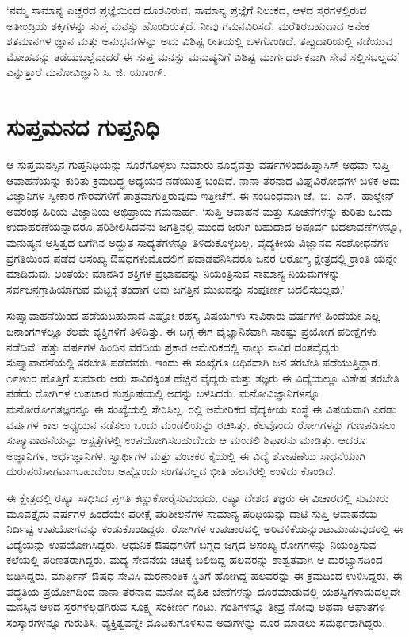 ‘ನಮ್ಮ ಸಾಮಾನ್ಯ ಎಚ್ಚರದ ಪ್ರಜ್ಞೆಯಿಂದ ದೂರವಿರುವ, ಸಾಮಾನ್ಯ ಪ್ರಜ್ಞೆಗೆ ನಿಲುಕದ, ಆಳದ ಸ್ತರಗಳಲ್ಲಿರುವ ಅತೀಂದ್ರಿಯ ಶಕ್ತಿಗಳನ್ನು ಸುಪ್ತ ಮನಸ್ಸು ಹೊಂದಿರುತ್ತದೆ. ನೀವು ಗಮನವಿರಿಸದೆ, ಮರೆತಿರಬಹುದಾದ ಅನೇಕ ಶತಮಾನಗಳ ಜ್ಞಾನ ಮತ್ತು ಅನುಭವಗಳನ್ನು ಅದು ವಿಶಿಷ್ಟ ರೀತಿಯಲ್ಲಿ ಒಳಗೊಂಡಿದೆ. ತಪ್ಪುದಾರಿಯಲ್ಲಿ ನಡೆಯುವ ಮೋಹವನ್ನು ತಡೆಯಬಲ್ಲೆವಾದರೆ ಈ ಸುಪ್ತ ಮನಸ್ಸು ಮನುಷ್ಯನಿಗೆ ವಿಶಿಷ್ಟ ಮಾರ್ಗದರ್ಶಕನಾಗಿ ಸೇವೆ ಸಲ್ಲಿಸಬಲ್ಲದು’ ಎನ್ನುತ್ತಾರೆ ಮನೋವಿಜ್ಞಾನಿ ಸಿ. ಜಿ. ಯೂಂಗ್.


\section*{ಸುಪ್ತಮನದ ಗುಪ್ತನಿಧಿ}


ಆ ಸುಪ್ತಮನಸ್ಸಿನ ಗುಪ್ತನಿಧಿಯನ್ನು ಸೂರೆಗೊಳ್ಳಲು ಸುಮಾರು ನೂರೈವತ್ತು ವರ್ಷಗಳಿಂದ\break ಹಿಪ್ನಾಸಿಸ್ ಅಥವಾ ಸುಪ್ತಿ ಆವಾಹನೆಯನ್ನು ಕುರಿತು ಕ್ರಮಬದ್ಧ ಅಧ್ಯಯನ ನಡೆಯುತ್ತ ಬಂದಿದೆ. ನಾನಾ ತೆರನಾದ ವಿಘ್ನವಿರೋಧಗಳ ಬಳಿಕ ಅದು ವಿಜ್ಞಾನಿಗಳ ಸ್ವೀಕಾರ ಗೌರವಗಳಿಗೆ ಪಾತ್ರವಾಗು\-ತ್ತಿರುವುದು ಇತ್ತೀಚೆಗೆ. ಈ ಸಂಬಂಧವಾಗಿ ಜೆ.\ ಬಿ.\ ಎಸ್.\ ಹಾಲ್ಡೇನ್​ ಅವರಂಥ ಹಿರಿಯ ವಿಜ್ಞಾನಿಯ ಅಭಿಪ್ರಾಯ ಗಮನಾರ್ಹ. ‘ಸುಪ್ತಿ ಆವಾಹನೆ ಮತ್ತು ಸೂಚನೆಗಳನ್ನು ಕುರಿತು ಒಂದು ಉದಾಹರಣೆಯನ್ನಾದರೂ ಪರಿಶೀಲಿಸಿದವನು ಜಗತ್ತಿನಲ್ಲಿ ಮುಂದೆ ಜರುಗ ಬಹುದಾದ ಅಪೂರ್ವ ಬದಲಾವಣೆಗಳನ್ನೂ, ಮನುಷ್ಯನ ಅಸ್ತಿತ್ವದ ಬಗೆಗಿನ ಅದ್ಭುತ ಸಾಧ್ಯತೆಗಳನ್ನೂ ತಿಳಿದುಕೊಳ್ಳಬಲ್ಲ. ವೈದ್ಯಕೀಯ ವಿಜ್ಞಾನದ ಸಂಶೋಧನೆಗಳ ಪ್ರಗತಿಯಿಂದ ಪಡೆದ ಅಸಂಖ್ಯ ಔಷಧಗಳು\break ಮೊದಲಿಗೆ ಪವಾಡವೆನಿಸಿದರೂ ಜನರ ಆರೋಗ್ಯ ಕ್ಷೇತ್ರದಲ್ಲಿ ಕ್ರಾಂತಿ ಯನ್ನೇ ಮಾಡಿದುವು. ಅಂತೆಯೇ ಮಾನಸಿಕ ಶಕ್ತಿಗಳ ಪ್ರಭಾವವನ್ನು ನಿಯಂತ್ರಿಸುವ ಸಾಮಾನ್ಯ ನಿಯಮಗಳನ್ನು ಸರ್ವ\-ಜನಗ್ರಾಹಿಯಾಗುವ ಮಟ್ಟಕ್ಕೆ ತಂದಾಗ ಅವು ಜಗತ್ತಿನ ಮುಖವನ್ನು ಸಂಪೂರ್ಣ ಬದಲಿಸಬಲ್ಲವು.’

ಸುಪ್ತ್ಯಾವಾಹನೆಯಿಂದ ಪಡೆಯಬಹುದಾದ ಎಷ್ಟೋ ರಹಸ್ಯ ವಿಷಯಗಳು ಸಾವಿರಾರು ವರ್ಷಗಳ ಹಿಂದೆಯೇ ಎಲ್ಲ ಜನಾಂಗಗಳಲ್ಲೂ ಕೆಲವೇ ವ್ಯಕ್ತಿಗಳಿಗೆ ತಿಳಿದಿತ್ತು. ಈ ಬಗ್ಗೆ ಈಗ ವೈಜ್ಞಾನಿಕವಾಗಿ ಸಾಕಷ್ಟು ಪ್ರಯೋಗ ಪರೀಕ್ಷೆಗಳು ನಡೆದಿವೆ. ಹತ್ತು ವರ್ಷಗಳ ಹಿಂದಿನ ವರದಿಯ ಪ್ರಕಾರ ಅಮೇರಿಕದಲ್ಲಿ ನಾಲ್ಕು ಸಾವಿರ ದಂತವೈದ್ಯರು ಸುಪ್ತ್ಯಾವಾಹನೆಯಲ್ಲಿ ತರಬೇತಿ ಪಡೆದವರು. ಇಂದು ಈ ಸಂಖ್ಯೆಗೂ ಅಧಿಕವಾಗಿ ಜನ ತರಬೇತಿ ಪಡೆಯುತ್ತಿದ್ದಾರೆ. ೧೯೫೦ರ ಹೊತ್ತಿಗೆ ಸುಮಾರು ಆರು ಸಾವಿರಕ್ಕಿಂತ ಹೆಚ್ಚಿನ ವೈದ್ಯರು ಮತ್ತು ತಜ್ಞರು ಈ ವಿದ್ಯೆಯಲ್ಲೂ ವಿಶೇಷ ತರಬೇತಿ ಪಡೆದು ರೋಗಿಗಳ ಉಪಚಾರ ಶುಶ್ರೂಷೆಯಲ್ಲಿ ಅದನ್ನು ಬಳಸಿದರು. ಮನೋವಿಜ್ಞಾನಿಗಳನ್ನೂ ಮನೋರೋಗತಜ್ಞರನ್ನೂ ಈ ಸಂಖ್ಯೆಯಲ್ಲಿ ಸೇರಿಸಿಲ್ಲ. ರಲ್ಲಿ ಅಮೇರಿಕದ ವೈದ್ಯಕೀಯ ಸಂಸ್ಥೆ ಈ ವಿಷಯವಾಗಿ ಎರಡು ವರ್ಷಗಳ ಕಾಲ ಅಧ್ಯಯನ ನಡೆಸಲು ಒಂದು ಮಂಡಲಿಯನ್ನು ರಚಿಸಿತ್ತು. ಕೆಲವೊಂದು ರೋಗಗಳನ್ನು ಗುಣಪಡಿಸಲು ಸುಪ್ತ್ಯಾವಾಹನೆಯನ್ನು ಆಸ್ಪತ್ರೆಗಳಲ್ಲಿ ಉಪಯೋಗಿಸಬಹುದೆಂದು ಆ ಮಂಡಲಿ ಶಿಫಾರಸು ಮಾಡಿತ್ತು. ಆದರೂ ಅಜ್ಞಾನಿಗಳ, ಅರ್ಧಜ್ಞಾನಿಗಳ, ಸ್ವಾರ್ಥಿಗಳ ಮತ್ತು ವಂಚಕರ ಕೈಯಲ್ಲಿ ಈ ವಿದ್ಯೆ ಶೋಷಣೆಯ ಸಾಧನೆಯಾಗಿ ದುರುಪಯೋಗವಾಗಬಹುದೆಂಬ ಅಷ್ಟೊಂದು ಸಂಗತವಲ್ಲದ ಭೀತಿ ಹಲವರಲ್ಲಿ ಉಳಿದು ಕೊಂಡಿದೆ.

ಈ ಕ್ಷೇತ್ರದಲ್ಲಿ ರಷ್ಯಾ ಸಾಧಿಸಿದ ಪ್ರಗತಿ ಕಣ್ಣುಕೋರೈಸುವಂಥದು. ರಷ್ಯಾ ದೇಶದ ತಜ್ಞರು ಈ ವಿಚಾರದಲ್ಲಿ ಸುಮಾರು ಮೂವತ್ತೈದು ವರ್ಷಗಳ ಹಿಂದೆಯೇ ಪರೀಕ್ಷೆ ಪರಿಶೀಲನೆಗಳ ಸಾಮಾನ್ಯ ಪರಿಧಿಯನ್ನು ದಾಟಿ ಸುಪ್ತಿ ಆವಾಹನೆಯ ನಿರ್ದಿಷ್ಟ ಉಪಯೋಗವನ್ನು ಕಂಡುಕೊಂಡಿದ್ದರು. ರೋಗಿಗಳ ಉಪಚಾರದಲ್ಲಿ ಅರಿವಳಿಕೆಯನ್ನುಂಟುಮಾಡುವುದರಲ್ಲಿ ಈ ವಿದ್ಯೆಯನ್ನು ಉಪಯೋಗಿ\-ಸಿದ್ದರು. ಆಧುನಿಕ ಔಷಧಗಳಿಗೆ ಬಗ್ಗದ ಜಗ್ಗದ ಅಸಂಖ್ಯ ರೋಗಗಳನ್ನು ನಿಯಂತ್ರಿಸುವ ಕಲೆಯಲ್ಲಿ ಪರಿಣತರಾಗಿದ್ದರು. ಮದ್ಯ ಸೇವನೆಯ ಚಟಕ್ಕೆ ಬಲಿಬಿದ್ದ ಹಲವರನ್ನು ಶಾಶ್ವತವಾಗಿ ಆ ದುರಭ್ಯಾಸದಿಂದ ಬಿಡಿಸಿದ್ದರು. ಮಾರ್ಫಿನ್ ಔಷಧ ಸೇವಿಸಿ ಮರಣಾಂತಿಕ ಸ್ಥಿತಿಗೆ ಹೋಗಿದ್ದ ಹಲವರನ್ನು ಈ ಕ್ರಮದಿಂದ ಉಳಿಸಿದ್ದರು. ಈ ಪದ್ಧತಿಯ ಪ್ರಯೋಗದಿಂದ ನಾನಾ ತೆರನಾದ ಮನೋ ದೈಹಿಕ ಬೇನೆಗಳನ್ನು ದೂರಮಾಡುವಲ್ಲಿ ಯಶಸ್ವಿಗಳಾದುದಲ್ಲದೇ ಮನಸ್ಸಿನ ಆಳದ ಸ್ತರಗಳಲ್ಲಡಗಿರುವ ಸೂಕ್ಷ್ಮ ಸಂಕೀರ್ಣ ಗಂಟು, ಗಂತಿಗಳನ್ನೂ ತೀವ್ರ ನೋವು ಅಥವಾ ಆಘಾತಗಳ ಸಂಸ್ಕಾರಗಳನ್ನೂ ಗುರುತಿಸಿ, ವ್ಯಕ್ತಿತ್ವವನ್ನೇ ಮೊಟಕುಗೊಳಿಸುವ ಅವುಗಳನ್ನು ದೂರ ಮಾಡಲು ಸಮರ್ಥರಾಗಿದ್ದರು.

